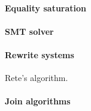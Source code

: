 \paragraph{Equality saturation}

\paragraph{SMT solver}

\paragraph{Rewrite systems}

Rete's algorithm.

\paragraph{Join algorithms}

